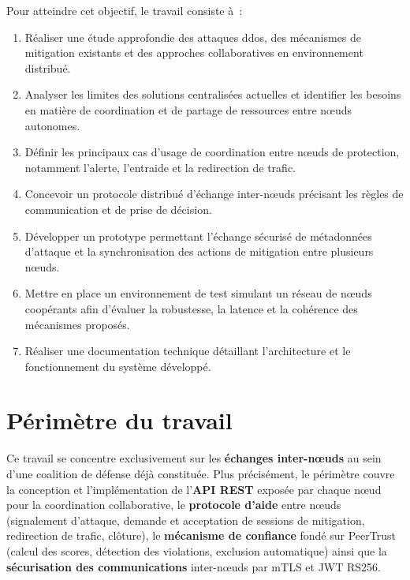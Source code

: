 Pour atteindre cet objectif, le travail consiste à~:
\begin{enumerate}
    \item Réaliser une étude approfondie des attaques \gls{ddos}, des mécanismes de mitigation existants et des approches collaboratives en environnement distribué.

    \item Analyser les limites des solutions centralisées actuelles et identifier les besoins en matière de coordination et de partage de ressources entre n\oe{}uds autonomes.

    \item Définir les principaux cas d'usage de coordination entre n\oe{}uds de protection, notamment l'alerte, l'entraide et la redirection de trafic.

    \item Concevoir un protocole distribué d'échange inter-n\oe{}uds précisant les règles de communication et de prise de décision.

    \item Développer un prototype permettant l'échange sécurisé de métadonnées d'attaque et la synchronisation des actions de mitigation entre plusieurs n\oe{}uds.

    \item Mettre en place un environnement de test simulant un réseau de n\oe{}uds coopérants afin d'évaluer la robustesse, la latence et la cohérence des mécanismes proposés.

    \item Réaliser une documentation technique détaillant l'architecture et le fonctionnement du système développé.
\end{enumerate}


\section*{Périmètre du travail}

Ce travail se concentre exclusivement sur les \textbf{échanges inter-nœuds} au sein d'une coalition de défense déjà constituée. Plus précisément, le périmètre couvre la conception et l'implémentation de l'\textbf{API REST} exposée par chaque nœud pour la coordination collaborative, le \textbf{protocole d'aide} entre nœuds (signalement d'attaque, demande et acceptation de sessions de mitigation, redirection de trafic, clôture), le \textbf{mécanisme de confiance} fondé sur PeerTrust (calcul des scores, détection des violations, exclusion automatique) ainsi que la \textbf{sécurisation des communications} inter-nœuds par mTLS et JWT RS256.

